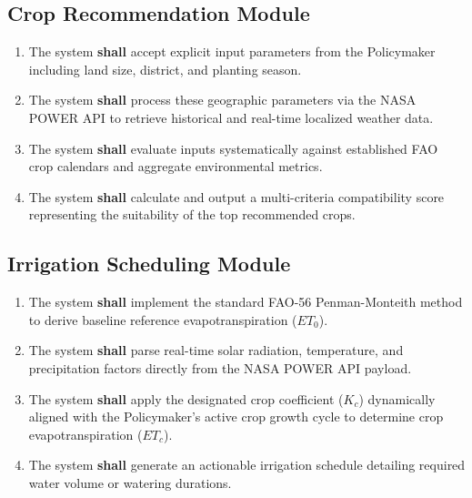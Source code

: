 \subsection{Crop Recommendation Module}
\begin{enumerate}
    \item The system \textbf{shall} accept explicit input parameters from the Policymaker including land size, district, and planting season.
    \item The system \textbf{shall} process these geographic parameters via the NASA POWER API to retrieve historical and real-time localized weather data.
    \item The system \textbf{shall} evaluate inputs systematically against established FAO crop calendars and aggregate environmental metrics.
    \item The system \textbf{shall} calculate and output a multi-criteria compatibility score representing the suitability of the top recommended crops.
\end{enumerate}

\subsection{Irrigation Scheduling Module}
\begin{enumerate}
    \item The system \textbf{shall} implement the standard FAO-56 Penman-Monteith method to derive baseline reference evapotranspiration ($ET_0$).
    \item The system \textbf{shall} parse real-time solar radiation, temperature, and precipitation factors directly from the NASA POWER API payload.
    \item The system \textbf{shall} apply the designated crop coefficient ($K_c$) dynamically aligned with the Policymaker's active crop growth cycle to determine crop evapotranspiration ($ET_c$).
    \item The system \textbf{shall} generate an actionable irrigation schedule detailing required water volume or watering durations.
\end{enumerate}

